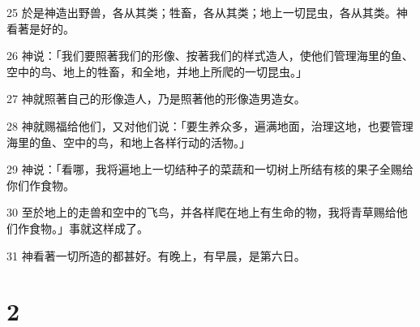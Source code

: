 \par 25 於是神造出野兽，各从其类；牲畜，各从其类；地上一切昆虫，各从其类。神看著是好的。
\par 26 神说：「我们要照著我们的形像、按著我们的样式造人，使他们管理海里的鱼、空中的鸟、地上的牲畜，和全地，并地上所爬的一切昆虫。」
\par 27 神就照著自己的形像造人，乃是照著他的形像造男造女。
\par 28 神就赐福给他们，又对他们说：「要生养众多，遍满地面，治理这地，也要管理海里的鱼、空中的鸟，和地上各样行动的活物。」
\par 29 神说：「看哪，我将遍地上一切结种子的菜蔬和一切树上所结有核的果子全赐给你们作食物。
\par 30 至於地上的走兽和空中的飞鸟，并各样爬在地上有生命的物，我将青草赐给他们作食物。」事就这样成了。
\par 31 神看著一切所造的都甚好。有晚上，有早晨，是第六日。

\chapter{2}

